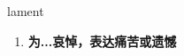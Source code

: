 
\begin{frame}
{\huge lament}
\begin{center}
\begin{enumerate}\Large
  \item \textbf{为...哀悼，表达痛苦或遗憾}
\end{enumerate}
\end{center}
\end{frame}
